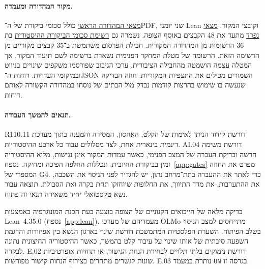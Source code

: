 \documentclass[11pt,a4paper]{article}
\DeclareRobustCommand{\textenglish}[1]{\foreignlanguage{english}{#1}}
\newcommand{\src}[2]{\href{https://github.com/Dnarts/rule110-dependency-fronts/blob/v2.2.1-monograph-multilingual/#1}{#2}}
\theoremstyle{definition}
\begin{document}
\paragraph{מקור המהדורה ומעמדה.}
\src{SHA256SUMS}{מצאי המהדורה הראשי} כולל סכומי ביקורת של ה־\textenglish{PDF}, שני יומני \textenglish{Lean} וקובצי המקור. \src{observer/sha256.txt}{מצאי נפרד} מתעד את 48 הקבצים באוסף הצופה. נשמרה גם \src{observer/provenance/observer-original.sha256}{רשימת סכומי הביקורת ההיסטורית} בת 36 הרשומות מן המהדורה המקורית. חבילת הפרסום משתמשת ב־35 קבצים מקוריים מן הרשימה הזאת. הרשומה של מטלת המחקר הפנימית נשארת ברשימה לשם תיעוד המקור, אך המטלה עצמה הושמטה מהחבילה הציבורית. ערכי הגיבוב שפורסמו משקפים שינויים בניווט ובמיקומי העדויות. דוחות ה־\textenglish{JSON} השמורים מכילים את התצפיות המקוריות. חוזה הבדיקה שנעשה בו שימוש בהרצות קודמות נבדק מול הבתים של נוסחו במהדורה הקשורה לאותם דוחות.

\paragraph{תנאים להמשך העבודה.}
\textenglish{R110.11} דורשת קידוד הניתן לאימות של הקלט, האחסון, המסירה והמענה בתוך מערכת דינמית בינארית אחת, לצד מסלולים עבור כל ארבע ההיסטוריות. \textenglish{AI.04} דורשת משימה חדשה ובדיקת העברה של המצב הפנימי, כאשר עמדות המקור אינן נגישות, מלוא ההיסטוריה זמין בביקורת החיובית, ונכללות החלפה הפיכה ומחיקה. נספח~\ref{app:gates} מפרט את החוזה המספרי של \textenglish{G4}. כדי לאתר את ההעברה בתת־מרחב נתון, יש להגדיר לפני הניסוי את השכבה, את ההתערבות, את מדד התיווך, את החלופות שיוחזקו תחת בקרה ואת הסבולת. תוצאה עבור נשא טקסטואלי יחיד משאירה תנאי זה פתוח.

בדיקה מלאה של הייבואים הקנוניים של הצופה בוצעה בעת הכנת המונוגרפיה באמצעות \textenglish{Lean~4.35.0} (נספח~\ref{app:lean}). מעמדיהם של מערכי \textenglish{OLMo} מתייחסים למצב הניסוי בשלב הפיתוח. השערת הפלסטיות המתמשכת דורשת שינוי בארגון הנשא בין אפיזודות והדגמת השפעה סיבתית של אותו שינוי על עיבוד קלט בהמשך, כאשר ההיסטוריה החיצונית נתונה לבקרה. \textenglish{E.02} דורשת נימוקים בלתי תלויים לבחירת הנחת הגישור, או תחזיות אופרטיביות שונות לגשרים מתחרים בצירוף הנחות קישור מפורשות. \textenglish{E.03} נותרת במעמד \textenglish{\texttt{UN}} בגרסה זו.

\clearpage
\begingroup\small
\end{document}
